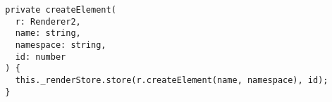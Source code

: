 \begin{verbatim}
  private createElement(
    r: Renderer2,
    name: string,
    namespace: string,
    id: number
  ) {
    this._renderStore.store(r.createElement(name, namespace), id);
  }
\end{verbatim}
